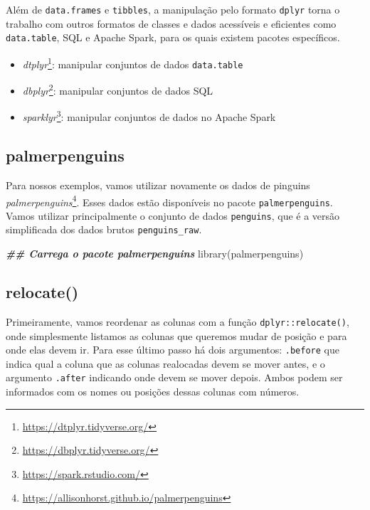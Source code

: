 \documentclass[
]{book}
\newenvironment{Shaded}{\begin{snugshade}}{\end{snugshade}}
\newcommand{\DocumentationTok}[1]{\textcolor[rgb]{0.37,0.37,0.37}{\textbf{\textit{#1}}}}
\newcommand{\FunctionTok}[1]{\textcolor[rgb]{0,0,0}{#1}}
\newcommand{\NormalTok}[1]{#1}
\providecommand{\tightlist}{%
  \setlength{\itemsep}{0pt}\setlength{\parskip}{0pt}}
\renewcommand{\href}[2]{#2\footnote{\url{#1}}}
\begin{document}
Além de \texttt{data.frames} e \texttt{tibbles}, a manipulação pelo formato \texttt{dplyr} torna o trabalho com outros formatos de classes e dados acessíveis e eficientes como \texttt{data.table}, SQL e Apache Spark, para os quais existem pacotes específicos.

\begin{itemize}
\tightlist
\item
  \href{https://dtplyr.tidyverse.org/}{\emph{dtplyr}}: manipular conjuntos de dados \texttt{data.table}
\item
  \href{https://dbplyr.tidyverse.org/}{\emph{dbplyr}}: manipular conjuntos de dados SQL
\item
  \href{https://spark.rstudio.com/}{\emph{sparklyr}}: manipular conjuntos de dados no Apache Spark
\end{itemize}

\hypertarget{palmerpenguins-1}{%
\subsection{palmerpenguins}\label{palmerpenguins-1}}

Para nossos exemplos, vamos utilizar novamente os dados de pinguins \href{https://allisonhorst.github.io/palmerpenguins}{\emph{palmerpenguins}}. Esses dados estão disponíveis no pacote \texttt{palmerpenguins}. Vamos utilizar principalmente o conjunto de dados \texttt{penguins}, que é a versão simplificada dos dados brutos \texttt{penguins\_raw}.

\begin{Shaded}
\begin{Highlighting}[]
\DocumentationTok{\#\# Carrega o pacote palmerpenguins}
\FunctionTok{library}\NormalTok{(palmerpenguins)}
\end{Highlighting}
\end{Shaded}

\hypertarget{relocate}{%
\subsection{relocate()}\label{relocate}}

Primeiramente, vamos reordenar as colunas com a função \texttt{dplyr::relocate()}, onde simplesmente listamos as colunas que queremos mudar de posição e para onde elas devem ir. Para esse último passo há dois argumentos: \texttt{.before} que indica qual a coluna que as colunas realocadas devem se mover antes, e o argumento \texttt{.after} indicando onde devem se mover depois. Ambos podem ser informados com os nomes ou posições dessas colunas com números.
\end{document}
